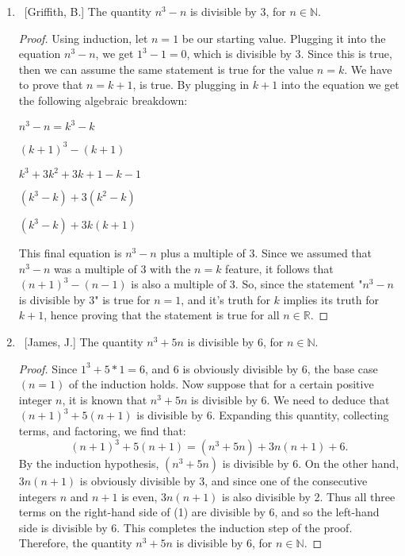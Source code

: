 \documentclass[10pt]{article}
\begin{document}
\begin{enumerate}
	\begin{enumerate}
	
	\item  ~[Griffith, B.] The quantity $n^3-n$ is divisible by $3$, for $n \in \mathbb{N}$.
 \begin{proof}
 Using induction, let $n =1$ be our starting value.  Plugging it into the equation $n^3-n$, we get $1^3-1=0$, which is divisible by 3.  Since this is true, then we can assume the same statement is true for the value $n = k$.  We have to prove that $n=k+1$, is true.  By plugging in $k+1$ into the equation we get the following algebraic breakdown:
 \begin{center}
 $n^3-n = k^3-k$
 \par \medskip
 $(k+1)^3-(k+1)$
 \par \medskip
 $k^3+3k^2+3k+1-k-1$
 \par \medskip
 $(k^3-k)+3(k^2-k)$
 \par \medskip
 $(k^3-k)+3k(k+1)$
 \end{center}
 This final equation is $n^3-n$ plus a multiple of 3.  Since we assumed that $n^3-n$ was a multiple of 3 with the $n=k$ feature, it follows that $(n+1)^3-(n-1)$ is also a multiple of 3.  So, since the statement "$n^3-n$ is divisible by $3$" is true for $n=1$, and it's truth for $k$ implies its truth for $k+1$, hence proving that the statement is true for all $n \in \mathbb{R}$.
 \end{proof}
	
	\item  ~[James, J.] The quantity $n^3+5n$ is divisible by $6$, for $n \in \mathbb{N}$.
 \begin{proof}
Since $1^3 + 5 * 1 = 6$, and 6 is obviously divisible by 6, the base case $(n = 1)$ of the induction holds. Now suppose that for a certain positive integer $n$, it is known that $n^3 + 5n$ is divisible by 6. We need to deduce that $(n + 1)^3 + 5(n + 1)$ is divisible by $6$. Expanding this quantity, collecting terms, and factoring, we find that:
\begin{equation}
    (n + 1)^3 + 5(n + 1) = (n^3 + 5n)+3n(n + 1) + 6.
\end{equation}
By the induction hypothesis, $(n^3 + 5n)$ is divisible by 6. On the other hand,
$3n(n+1)$ is obviously divisible by 3, and since one of the consecutive integers
$n$ and $n + 1$ is even, $3n(n + 1)$ is also divisible by 2. Thus all three terms
on the right-hand side of (1) are divisible by 6, and so the left-hand side is
divisible by 6. This completes the induction step of the proof.  Therefore, the quantity $n^3+5n$ is divisible by $6$, for $n \in \mathbb{N}$.
 \end{proof}	
	\end{enumerate}


\end{enumerate}
\end{document}
